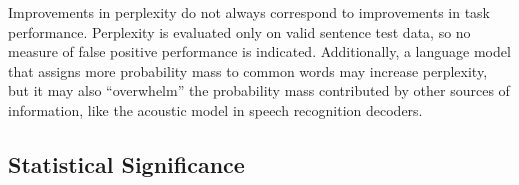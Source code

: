 \documentclass[10pt]{article}
\newcommand{\ngram}{$n$-gram\xspace}
\newcommand{\ngrams}{$n$-grams\xspace}
\newcommand{\cnt}[1]{\mathfrak{C}\left(#1\right)}
\newcommand{\cprb}[2]{P\left(#1 \;\middle\vert\; #2 \right)}
\begin{document}
Improvements in perplexity do not always correspond to improvements in task performance. 
Perplexity is evaluated only on valid sentence test data, so no measure of false positive performance is indicated.
Additionally, a language model that assigns more probability mass to common words may increase perplexity, but it may also ``overwhelm'' the probability mass contributed by other sources of information, like the acoustic model in speech recognition decoders.


\subsection{Statistical Significance}



% 
% 
\end{document}
